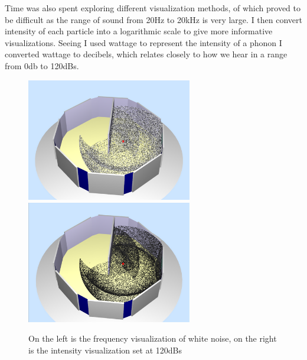 \documentclass{thesis}
\begin{document}
Time was also spent exploring different visualization methods, of which proved to be difficult as the range of sound from 20Hz to 20kHz is very large. I then convert intensity of each particle into a logarithmic scale to give more informative visualizations. Seeing I used wattage to represent the intensity of a phonon I converted wattage to decibels, which relates closely to how we hear in a range from 0db to 120dBs.
\begin{figure}
        \centering
        \includegraphics[width=2.845in]{images/freq_show}
        \includegraphics[width=2.845in]{images/intensity_show}
           \caption{On the left is the frequency visualization of white noise, on the right
           is the intensity visualization set at 120dBs}
    \end{figure}
    
\end{document}
